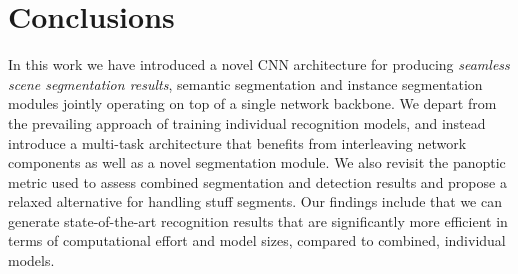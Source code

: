 \documentclass[10pt,twocolumn,letterpaper]{article}
\begin{document}
\section{Conclusions}
In this work we have introduced a novel CNN architecture for producing \textit{seamless scene segmentation results}, \ie semantic segmentation and instance segmentation modules jointly operating on top of a single network backbone. We depart from the prevailing approach of training individual recognition models, and instead introduce a multi-task architecture that benefits from interleaving network components as well as a novel segmentation module. We also revisit the panoptic metric used to assess combined segmentation and detection results and propose a relaxed alternative for handling stuff segments. Our findings include that we can generate state-of-the-art recognition results that are significantly more efficient in terms of computational effort and model sizes, compared to combined, individual models.




	
\end{document}
